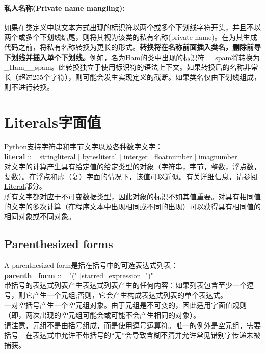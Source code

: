 \documentclass[10pt,UTF8]{ctexart}
\begin{document}
\paragraph{私人名称(Private name mangling):}如果在类定义中以文本方式出现的标识符以两个或多个下划线字符开头，并且不以两个或多个下划线结尾，则将其视为该类的私有名称(private name)。在为其生成代码之前，将私有名称转换为更长的形式。\textbf{转换将在名称前面插入类名，删除前导下划线并插入单个下划线。}例如，名为Ham的类中出现的标识符__spam将转换为_Ham__spam。此转换独立于使用标识符的语法上下文。如果转换后的名称非常长（超过255个字符），则可能会发生实现定义的截断。如果类名仅由下划线组成，则不进行转换。
\section{Literals字面值}
Python支持字符串和字节文字以及各种数字文字：\\
\textbf{literal} ::= stringliteral | bytesliteral | interger | floatnumber | imagnumber\\
对文字的计算产生具有给定值的给定类型的对象（字符串，字节，整数，浮点数，复数）。在浮点和虚（复）字面的情况下，该值可以近似。有关详细信息，请参阅\href{https://docs.python.org/3/reference/lexical_analysis.html#literals}{Literal}部分。\\
\indent 所有文字都对应于不可变数据类型，因此对象的标识不如其值重要。对具有相同值的文字的多次计算（在程序文本中出现相同或不同的出现）可以获得具有相同值的相同对象或不同对象。
\subsection{Parenthesized forms}
A parenthesized form是括在括号中的可选表达式列表：\\
\textbf{parenth_form} ::= "(" [starred_expression] ")"\\
\indent 带括号的表达式列表产生表达式列表产生的任何内容：如果列表包含至少一个逗号，则它产生一个元组;否则，它会产生构成表达式列表的单个表达式。\\
\indent 一对空括号产生一个空元组对象。由于元组是不可变的，因此适用字面值规则（即，两次出现的空元组可能会或可能不会产生相同的对象）。\\
\indent 请注意，元组不是由括号组成，而是使用逗号运算符。唯一的例外是空元组，需要括号 - 在表达式中允许不带括号的“无”会导致含糊不清并允许常见错别字传递未被捕获。
\end{document}
